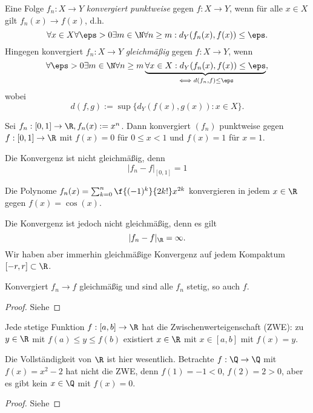 \begin{df}
	Eine Folge $f_n: X \to Y$ \emph{konvergiert punktweise} gegen $f: X \to Y$, wenn für alle $x \in X$ gilt $f_n(x) \to f(x)$, d.h.
	\[
		\forall x \in X \forall \eps > 0 \exists m \in \N \forall n \ge m : d_Y(f_n(x), f(x)) \le \eps.
	\]
	Hingegen konvergiert $f_n: X \to Y$ \emph{gleichmäßig} gegen $f: X \to Y$, wenn
	\[
		\forall \eps > 0 \exists m \in \N \forall n \ge m \underbrace{\forall x \in X : d_Y(f_n(x), f(x)) \le \eps}_{\iff d (f_n, f) \le \eps},
	\]
	wobei
	\[
		d(f,g)
		:= \sup \{ d_Y(f(x), g(x)) : x \in X \}.
	\]
\end{df}

\begin{ex}
	Sei $f_n : [0,1] \to \R, f_n(x) := x^n$.
	Dann konvergiert $(f_n)$ punktweise gegen $f:[0,1] \to \R$ mit $f(x) = 0$ für $0 \le x < 1$ und $f(x) = 1$ für $x=1$.

	Die Konvergenz ist nicht gleichmäßig, denn
	\[
		|f_n - f|_{[0,1]} = 1
	\]
\end{ex}

\begin{ex}
	Die Polynome $f_n(x) = \sum_{k=0}^n \f{(-1)^k}{2k!} x^{2k}$ konvergieren in jedem $x \in \R$ gegen $f(x) = \cos(x)$.

	Die Konvergenz ist jedoch nicht gleichmäßig, denn es gilt
	\[
		|f_n - f|_{\R} = \infty.
	\]
	Wir haben aber immerhin gleichmäßige Konvergenz auf jedem Kompaktum $[-r,r] \subset \R$.
\end{ex}

\begin{st}
	Konvergiert $f_n \to f$ gleichmäßig und sind alle $f_n$ stetig, so auch $f$.
	\begin{proof}
		Siehe 
	\end{proof}
\end{st}

\begin{st}
	Jede stetige Funktion $f: [a,b] \to \R$ hat die Zwischenwerteigenschaft (ZWE): zu $y \in \R$ mit $f(a) \le y \le f(b)$ existiert $x \in \R$ mit $x \in [a,b]$ mit $f(x) = y$.
	\begin{note}
		Die Vollständigkeit von $\R$ ist hier wesentlich.
		Betrachte $f: \Q \to \Q$ mit $f(x) = x^2 - 2$ hat nicht die ZWE, denn $f(1) = - 1 < 0$, $f(2) = 2 > 0$, aber es gibt kein $x \in \Q$ mit $f(x) = 0$.
	\end{note}
	\begin{proof}
		Siehe 
	\end{proof}
\end{st}

